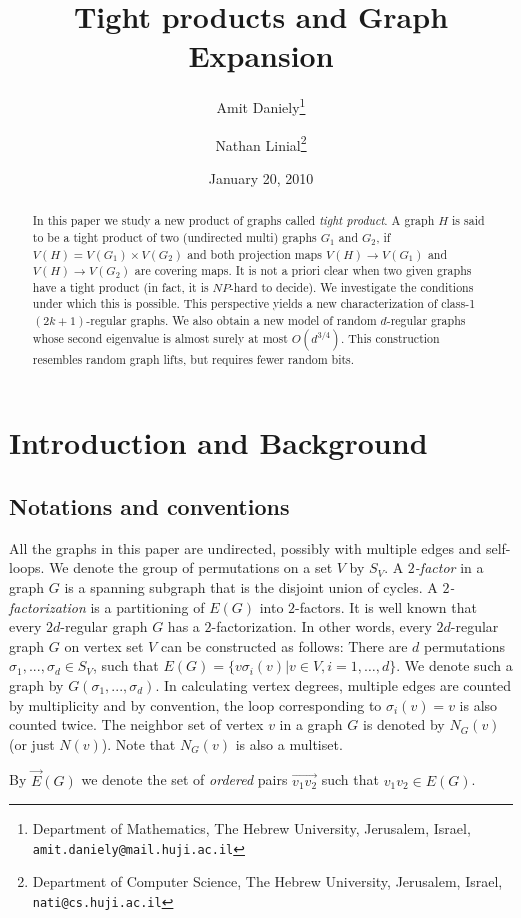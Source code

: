 \documentclass[12pt]{article}
\title{Tight products and Graph Expansion}
\author{
  Amit Daniely\thanks{Department of Mathematics,
    The Hebrew University, Jerusalem, Israel,
    {\tt amit.daniely@mail.huji.ac.il}}
\and
  Nathan Linial\thanks{Department of Computer Science,
    The Hebrew University, Jerusalem, Israel,
    {\tt nati@cs.huji.ac.il}}
}
\date{January 20, 2010}
\newtheorem{open question}[theorem]{Open question}
\begin{document}
 
\maketitle
\begin{abstract}
In this paper we study a new product of graphs called
{\em tight product}. A graph $H$ is said to be a tight product of
two (undirected multi) graphs $G_1$ and $G_2$,
if $V(H)=V(G_1)\times V(G_2)$ and both projection maps $V(H)\rightarrow V(G_1)$
and $V(H)\rightarrow V(G_2)$ are covering maps. It is not a priori
clear when two given graphs have a tight product (in fact, it
is $NP$-hard to decide). We investigate the conditions under which this
is possible. This perspective yields a new
characterization of class-1 $(2k+1)$-regular graphs.
We also obtain a new model of random $d$-regular graphs whose
second eigenvalue is almost surely at most $O(d^{3/4})$.
This construction resembles random graph lifts,
but requires fewer random bits.
\end{abstract}


\section{Introduction and Background}
\subsection{Notations and conventions}
All the graphs in this paper are undirected, possibly with
multiple edges and
self-loops. We denote the group of permutations on a set $V$
by $S_V$. A {\em $2$-factor} in a graph $G$ is a spanning subgraph
that is the disjoint union of cycles. A {\em $2$-factorization}
is a partitioning of $E(G)$ into $2$-factors. It is well known
\cite{Diestel} that every $2d$-regular graph $G$ has a $2$-factorization.
In other words, every $2d$-regular graph $G$ on vertex set $V$ can be
constructed as follows: There are $d$ permutations $\sigma_1,...,\sigma_d \in S_V$,
such that $E(G)=\{v \sigma_i(v) | v\in V, i=1,\ldots,d\}$.
We denote such a graph by $G(\sigma_1,...,\sigma_d)$. In calculating vertex degrees, multiple
edges are counted by multiplicity and by convention, the
loop corresponding to $\sigma_i(v)=v$ is also counted twice. The neighbor set of
vertex $v$ in a graph $G$ is denoted by $N_G(v)$ (or just $N(v)$). Note that $N_G(v)$ is also a multiset.

By $\vec{E}(G)$ we denote the set of {\em ordered} pairs $\overrightarrow{v_1v_2}$ such that $v_1v_2\in E(G)$.
\end{document}
